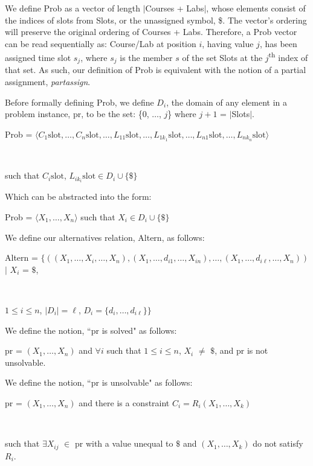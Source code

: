 \documentclass[11pt, oneside]{article}   	%
\begin{document}

\noindent We define Prob as a vector of length $\vert$Courses + Labs$\vert$, whose elements consist of the indices of slots from Slots, or the unassigned symbol, \$. The vector's ordering will preserve the original ordering of Courses + Labs. Therefore, a Prob vector can be read sequentially as: Course/Lab at position $i$, having value $j$, has been assigned time slot $s_j$, where $s_j$ is the member $s$ of the set Slots at the $j$\textsuperscript{th} index of that set. As such, our definition of Prob is equivalent with the notion of a partial assignment, \textit{partassign}.

\noindent Before formally defining Prob, we define $D_i$, the domain of any element in a problem instance, pr, to be the set: \{0, $\dots$, $j$\} where $j+1$ = $\vert$Slots$\vert$.

\noindent \centerline{Prob =  $\langle C_1 \text{slot}, \dots, C_n \text{slot}, \dots, L_{11} \text{slot}, \dots, L_{1{k_1}} \text{slot}, \dots, L_{n1} \text{slot}, \dots, L_{n{k_n}} \text{slot}\rangle$}\\
\centerline{such that $C_i \text{slot}$, $L_{i{k_i}} \text{slot} \in D_i \cup \{\$\}$}

\noindent Which can be abstracted into the form:

\noindent \centerline{Prob = $\langle X_1, \dots, X_n\rangle$ such that $X_i \in D_i \cup \{\$\}$}

\noindent We define our alternatives relation, Altern, as follows:

\noindent \centerline{Altern = $\{((X_1, \dots, X_i, \dots, X_n), (X_1, \dots, d_{i1}, \dots, X_{in}), \dots, (X_1, \dots, d_{i\ell}, \dots, X_n))$ $\vert$ $X_i$ = $\$$,}\\
\centerline{$1 \le i \le n$, $\vert D_i \vert = \ell$, $D_i = \{d_i, \dots, d_{i\ell}\}\}$}

\noindent We define the notion, ``pr is solved" as follows:

\noindent \centerline{pr = $(X_1, \dots, X_n)$ and $\forall i$ such that $1 \le i \le n$, $X_i$ $\neq$ $\$$, and pr is not unsolvable.}

\noindent We define the notion, ``pr is unsolvable" as follows:

\noindent \centerline{pr = $(X_1, \dots, X_n)$ and there is a constraint $C_i = R_i(X_1, \dots, X_k)$}\\
\centerline{such that $\exists X_{ij}$ $\in$ pr with a value unequal to $\$$ and $(X_1, \dots, X_k)$ do not satisfy $R_i$.}
\end{document}

